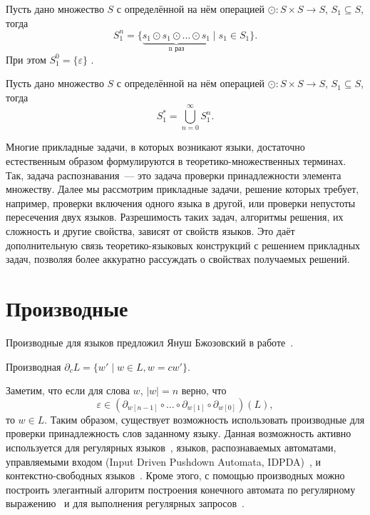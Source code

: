 \begin{definition}[TODO: ???]
    Пусть дано множество $S$ с определённой на нём операцией $\odot: S \times S \to S$, $S_1 \subseteq S$, тогда
    \[S_1^n = \{ \underbrace{s_1 \odot s_1 \odot \dots \odot s_1}_{\text{n раз}} \mid s_1 \in S_1\}.\]
    При этом $S_1^0 = \{\varepsilon\}$%
    .
\end{definition}

\begin{definition}[TODO: ???]
    Пусть дано множество $S$ с определённой на нём операцией $\odot: S \times S \to S$, $S_1 \subseteq S$, тогда
    \[S_1^* = \bigcup_{n = 0}^{\infty} S_1^n.\]
\end{definition}

Многие прикладные задачи, в которых возникают языки, достаточно естественным образом формулируются в теоретико-множественных терминах.
Так, задача распознавания~--- это задача проверки принадлежности элемента множеству.
Далее мы рассмотрим прикладные задачи, решение которых требует, например, проверки включения одного языка в другой, или проверки непустоты пересечения двух языков.
Разрешимость таких задач, алгоритмы решения, их сложность и другие свойства, зависят от свойств языков.
Это даёт дополнительную связь теоретико-языковых конструкций с решением прикладных задач, позволяя более аккуратно рассуждать о свойствах получаемых решений.

\section{Производные}

Производные для языков предложил Януш Бжозовский в работе~.

\begin{definition}
    Производная $\partial_c L = \{ w' \mid w \in L, w = cw'\}$.
\end{definition}

Заметим, что если для слова $w$, $|w| = n$ верно, что
\[\varepsilon \in (\partial_{w[n-1]} \circ \dots \circ \partial_{w[1]}  \circ \partial_{w[0]}) (L),\]
то $w \in L$.
Таким образом, существует возможность использовать производные для проверки принадлежность слов заданному языку.
Данная возможность активно используется для регулярных языков~, языков, распознаваемых автоматами, управляемыми входом (Input Driven Pushdown Automata, IDPDA)~, и контекстно-свободных языков~.
Кроме этого, с помощью производных можно построить элегантный алгоритм построения конечного автомата по регулярному выражению~ и для выполнения регулярных запросов~.

